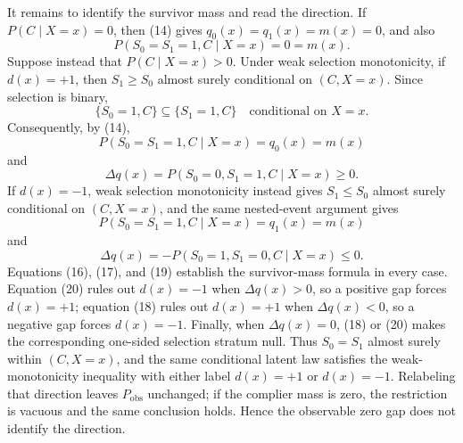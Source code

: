 It remains to identify the survivor mass and read the direction.  If \(P(C\mid X=x)=0\), then (14) gives \(q_0(x)=q_1(x)=m(x)=0\), and also
\[
P(S_0=S_1=1,C\mid X=x)=0=m(x).
\tag{16}
\]
Suppose instead that \(P(C\mid X=x)>0\).  Under weak selection monotonicity, if \(d(x)=+1\), then \(S_1\ge S_0\) almost surely conditional on \((C,X=x)\).  Since selection is binary,
\[
\{S_0=1,C\}\subseteq\{S_1=1,C\}\quad\text{conditional on }X=x.
\]
Consequently, by (14),
\[
P(S_0=S_1=1,C\mid X=x)=q_0(x)=m(x)
\tag{17}
\]
and
\[
\Delta q(x)=P(S_0=0,S_1=1,C\mid X=x)\ge0.
\tag{18}
\]
If \(d(x)=-1\), weak selection monotonicity instead gives \(S_1\le S_0\) almost surely conditional on \((C,X=x)\), and the same nested-event argument gives
\[
P(S_0=S_1=1,C\mid X=x)=q_1(x)=m(x)
\tag{19}
\]
and
\[
\Delta q(x)=-P(S_0=1,S_1=0,C\mid X=x)\le0.
\tag{20}
\]
Equations (16), (17), and (19) establish the survivor-mass formula in every case.  Equation (20) rules out \(d(x)=-1\) when \(\Delta q(x)>0\), so a positive gap forces \(d(x)=+1\); equation (18) rules out \(d(x)=+1\) when \(\Delta q(x)<0\), so a negative gap forces \(d(x)=-1\).  Finally, when \(\Delta q(x)=0\), (18) or (20) makes the corresponding one-sided selection stratum null.  Thus \(S_0=S_1\) almost surely within \((C,X=x)\), and the same conditional latent law satisfies the weak-monotonicity inequality with either label \(d(x)=+1\) or \(d(x)=-1\).  Relabeling that direction leaves \(P_{\mathrm{obs}}\) unchanged; if the complier mass is zero, the restriction is vacuous and the same conclusion holds.  Hence the observable zero gap does not identify the direction.